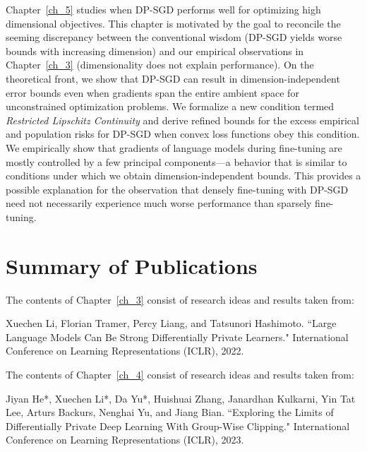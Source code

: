 Chapter~\ref{ch_5} studies when DP-SGD performs well for optimizing high dimensional objectives. 
This chapter is motivated by the goal to reconcile the seeming discrepancy between the conventional wisdom (DP-SGD yields worse bounds with increasing dimension) and our empirical observations in Chapter~\ref{ch_3} (dimensionality does not explain performance).
On the theoretical front, we show that DP-SGD can result in dimension-independent error bounds even when gradients span the entire ambient space for unconstrained optimization problems.
We formalize a new condition termed \emph{Restricted Lipschitz Continuity} and derive refined bounds for the excess empirical and population risks for DP-SGD when convex loss functions obey this condition.
We empirically show that gradients of language models during fine-tuning are mostly
controlled by a few principal components---a behavior that is similar to conditions under which we
obtain dimension-independent bounds. 
This provides a possible explanation for the observation that densely fine-tuning with DP-SGD need not necessarily experience much
worse performance than sparsely fine-tuning.

\newpage
\section{Summary of Publications}

\noindent The contents of Chapter~\ref{ch_3} consist of research ideas and results taken from:

\begin{mdframed}[leftline=true, topline=false, rightline=false, bottomline=false, linewidth=2pt]
Xuechen Li, Florian Tramer, Percy Liang, and Tatsunori Hashimoto. ``Large Language Models Can Be Strong Differentially Private Learners." International Conference on Learning Representations (ICLR), 2022.~\citep{li2022large}
\end{mdframed}

\noindent The contents of Chapter~\ref{ch_4} consist of research ideas and results taken from:

\begin{mdframed}[leftline=true, topline=false, rightline=false, bottomline=false, linewidth=2pt]
Jiyan He*, Xuechen Li*, Da Yu*, Huishuai Zhang, Janardhan Kulkarni, Yin Tat Lee, Arturs Backurs, Nenghai Yu, and Jiang Bian. ``Exploring the Limits of Differentially Private Deep Learning With Group-Wise Clipping." International Conference on Learning Representations (ICLR), 2023.~\citep{he2022exploring}
\end{mdframed}

